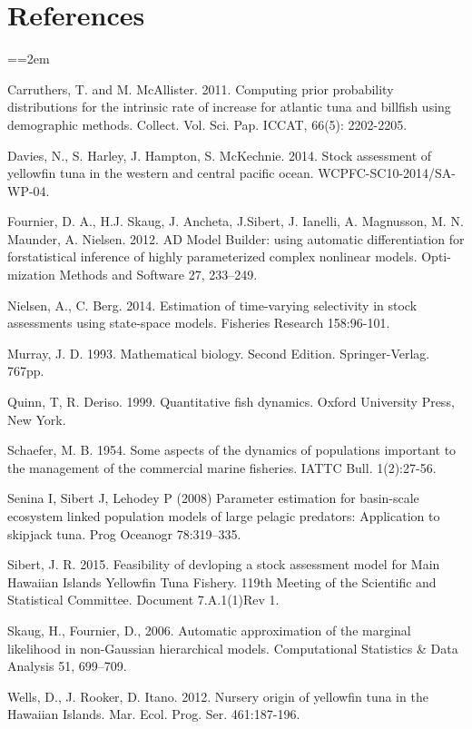 \documentclass[12pt,letterpaper,twoside]{article}
\newcommand\doublespacing{\baselineskip=1.6\normalbaselineskip}
\begin{document}
\section*{References}
{\parindent=0cm \small
\everypar={\hangindent=2em }\par
Carruthers, T. and M. McAllister. 2011.
Computing prior probability distributions for the
intrinsic rate of increase for atlantic tuna and
billfish using demographic methods.
Collect. Vol. Sci. Pap. ICCAT, 66(5): 2202-2205.

Davies, N., S. Harley, J. Hampton, S. McKechnie. 2014. Stock
assessment of yellowfin tuna in the western and central pacific ocean.
WCPFC-SC10-2014/SA-WP-04.

Fournier, D. A., H.J. Skaug, J. Ancheta, J.Sibert, J. Ianelli, 
A. Magnusson, M. N. Maunder, A. Nielsen. 2012. AD Model Builder:
using automatic differentiation for forstatistical inference of highly
parameterized complex nonlinear models. Opti-mization Methods and
Software 27, 233–249.

Nielsen, A., C. Berg. 2014. Estimation of time-varying selectivity
in stock assessments using state-space models. Fisheries Research
158:96-101.

Murray, J. D. 1993. Mathematical biology. Second Edition.
Springer-Verlag. 767pp.

Quinn, T, R. Deriso. 1999. Quantitative fish dynamics. Oxford
University Press, New York.

Schaefer, M. B. 1954. Some aspects of the dynamics of populations
important to the management of the commercial marine fisheries. IATTC
Bull. 1(2):27-56.

Senina I, Sibert J, Lehodey P (2008) Parameter estimation for
basin-scale ecosystem linked population models of large pelagic
predators: Application to skipjack tuna.  Prog Oceanogr 78:319–335.

Sibert, J. R. 2015. Feasibility of devloping a stock assessment
model for Main Hawaiian Islands Yellowfin Tuna Fishery.
119th Meeting of the Scientific and Statistical Committee.
Document 7.A.1(1)Rev 1.

Skaug, H., Fournier, D., 2006. Automatic approximation of the marginal
likelihood in non-Gaussian hierarchical models. Computational
Statistics \& Data Analysis 51, 699–709.

Wells, D., J. Rooker, D. Itano. 2012.  Nursery origin of yellowfin
tuna in the Hawaiian Islands. Mar. Ecol. Prog. Ser. 461:187-196. 
\par}
\end{document}
